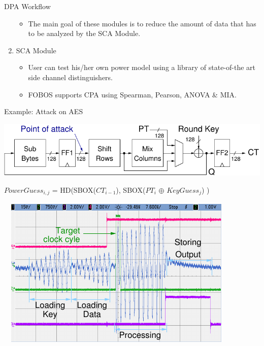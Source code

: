 \documentclass[xcolor=pdftex,dvipsnames,table,final]{beamer}
\begin{document}
\begin{frame}[fragile]{}
\begin{columns}[t]
\begin{column}{.31\linewidth}
\begin{block}{DPA Workflow}
\begin{enumerate}
          \begin{itemize}
            \item The main goal of these modules is to reduce the amount of data that 
                  has to be analyzed by the SCA Module.
          \end{itemize}
          \item SCA Module
          \begin{itemize}
            \item User can test his/her own power model using a library of state-of-the art side channel
                  distinguishers.
            \item FOBOS supports CPA using Spearman, Pearson, ANOVA \& MIA.
          \end{itemize}
        \end{enumerate}

       \end{block}
       
       \begin{block}{Example: Attack on AES}
        \vspace{-1ex}
         \begin{center}
           \includegraphics[width=0.9\linewidth]{../figures/aes128}

           {\small $PowerGuess_{i, j}$ = HD(SBOX($CT_{i-1}$), SBOX($PT_{i}$ $\oplus$ $KeyGuess_{j}$) )}
         \end{center}
	 \begin{minipage}[t]{0.49\linewidth}
			~~\includegraphics[width=0.80\linewidth]{../figures/oscilloscope-all-4ch} 
	 

\end{minipage}
\end{block}
\end{column}
\end{columns}
\end{frame}
\end{document}
